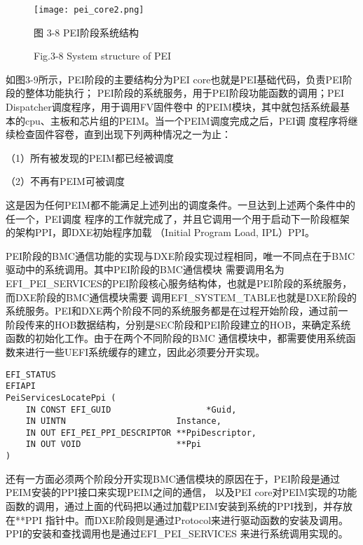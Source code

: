 \begin{figure}[htb]
    \vspace{0cm}   
    \setlength{\abovecaptionskip}{0.3cm}
	\centering
    \texttt{[image: pei\_core2.png]}
    \caption*{图 3-8 PEI阶段系统结构}
    \setlength{\belowcaptionskip}{-0.7cm}
    \caption*{Fig.3-8 System structure of PEI}
\end{figure}

如图3-9所示，PEI阶段的主要结构分为PEI core也就是PEI基础代码，负责PEI阶段的整体功能执行；
PEI阶段的系统服务，用于PEI阶段功能函数的调用；PEI Dispatcher调度程序，用于调用FV固件卷中
的PEIM模块，其中就包括系统最基本的cpu、主板和芯片组的PEIM。当一个PEIM调度完成之后，PEI调
度程序将继续检查固件容卷，直到出现下列两种情况之一为止：
\par （1）所有被发现的PEIM都已经被调度
\par （2）不再有PEIM可被调度
\par 这是因为任何PEIM都不能满足上述列出的调度条件。一旦达到上述两个条件中的任一个，PEI调度
程序的工作就完成了，并且它调用一个用于启动下一阶段框架的架构PPI，即DXE初始程序加载
（Initial Program Load, IPL）PPI。

\par PEI阶段的BMC通信功能的实现与DXE阶段实现过程相同，唯一不同点在于BMC驱动中的系统调用。其中PEI阶段的BMC通信模块
需要调用名为EFI\_PEI\_SERVICES的PEI阶段核心服务结构体，也就是PEI阶段的系统服务，而DXE阶段的BMC通信模块需要
调用EFI\_SYSTEM\_TABLE也就是DXE阶段的系统服务。PEI和DXE两个阶段不同的系统服务都是在过程开始阶段，通过前一
阶段传来的HOB数据结构，分别是SEC阶段和PEI阶段建立的HOB，来确定系统函数的初始化工作。由于在两个不同阶段的BMC
通信模块中，都需要使用系统函数来进行一些UEFI系统缓存的建立，因此必须要分开实现。

\begin{lstlisting}
EFI_STATUS
EFIAPI
PeiServicesLocatePpi (
    IN CONST EFI_GUID                   *Guid,
    IN UINTN                      Instance,
    IN OUT EFI_PEI_PPI_DESCRIPTOR **PpiDescriptor,
    IN OUT VOID                   **Ppi
)
\end{lstlisting}
还有一方面必须两个阶段分开实现BMC通信模块的原因在于，PEI阶段是通过PEIM安装的PPI接口来实现PEIM之间的通信，
以及PEI core对PEIM实现的功能函数的调用，通过上面的代码把以通过加载PEIM安装到系统的PPI找到，并存放在**PPI
指针中。而DXE阶段则是通过Protocol来进行驱动函数的安装及调用。PPI的安装和查找调用也是通过EFI\_PEI\_SERVICES
来进行系统调用实现的。

